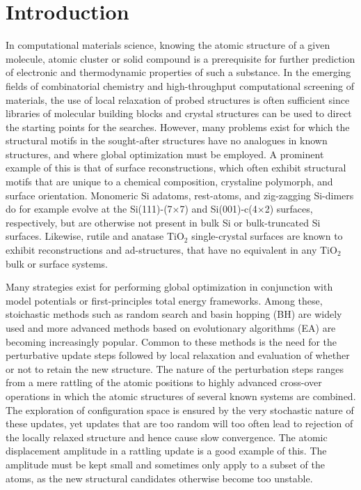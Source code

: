 \documentclass[aip,amsmath,amssymb,reprint]{revtex4-1}
\begin{document}
\section{\label{sec:introduction}Introduction}
In computational materials science, knowing the atomic structure of a
given molecule, atomic cluster or solid compound is a prerequisite for
further prediction of electronic and thermodynamic properties of such
a substance. In the emerging fields of combinatorial chemistry and
high-throughput computational screening of materials,\cite{curtarolo2013} the use of local
relaxation of probed structures is often sufficient since libraries of
molecular building blocks and crystal structures can be used to direct
the starting points for the searches.\cite{hafner2006} However, many problems exist for
which the structural motifs in the sought-after structures have no
analogues in known structures, and where global optimization must be
employed. A prominent example of this is that of surface reconstructions,
which often exhibit structural motifs that are unique to a chemical
composition, crystaline polymorph, and surface orientation. Monomeric
Si adatoms, rest-atoms, and zig-zagging Si-dimers do for example evolve at the
Si(111)-(7$\times$7) and Si(001)-c(4$\times$2) surfaces,\cite{si7x7,si4x2} respectively, but
are otherwise not present in bulk Si or bulk-truncated Si surfaces. Likewise,
rutile and anatase TiO$_2$ single-crystal surfaces are known to exhibit
reconstructions and ad-structures,\cite{anatase1,anatase2,rutile1,rutile2} that have no equivalent in any TiO$_2$ bulk or surface systems.

Many strategies exist for performing global optimization in
conjunction with model potentials or first-principles total energy
frameworks. Among these, stoichastic methods such as random search\cite{pickard2011} and
basin hopping (BH)\cite{wales1997} are widely used and more advanced methods based on
evolutionary algorithms (EA) are becoming increasingly popular.\cite{johnston2003,Oganov2006,Bhattacharya2013} Common
to these methods is the need for the perturbative update steps
followed by local relaxation and evaluation of whether or not to
retain the new structure. The nature of the perturbation steps ranges
from a mere rattling of the atomic positions to highly advanced
cross-over operations in which the atomic structures of several known
systems are combined.\cite{ho1995} The exploration\cite{mathias2018,yamashita2018} of configuration space is
ensured by the very stochastic nature of these updates, yet updates
that are too random will too often lead to rejection of the locally
relaxed structure and hence cause slow convergence. The atomic
displacement amplitude in a rattling update is a good example of
this. The amplitude must be kept small and sometimes only apply to a
subset of the atoms, as the new structural candidates otherwise become
too unstable.
\end{document}

